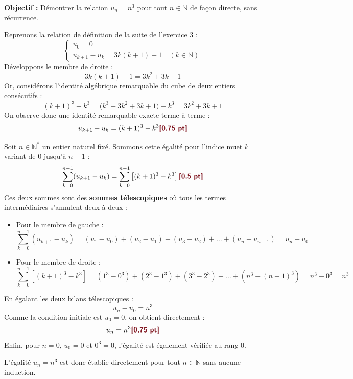 \documentclass[11pt,a4paper]{article}
\newcommand{\bareme}[1]{\hfill\textbf{\textcolor{secondary}{\sffamily[#1]}}}
\newcommand{\N}{\mathbb{N}}
\begin{document}
\begin{correctionbox}[Corrigé du Bonus (+2 points) \bareme{Total : +2 points}]
\textbf{Objectif :} Démontrer la relation $u_n = n^3$ pour tout $n \in \N$ de façon directe, sans récurrence.

\medskip
Reprenons la relation de définition de la suite de l'exercice 3 :
\[
\begin{cases}
u_0 = 0 \\
u_{k+1} - u_k = 3k(k+1) + 1 \quad (k \in \N)
\end{cases}
\]
Développons le membre de droite :
\[
3k(k+1) + 1 = 3k^2 + 3k + 1
\]
Or, considérons l'identité algébrique remarquable du cube de deux entiers consécutifs :
\[
(k+1)^3 - k^3 = \big(k^3 + 3k^2 + 3k + 1\big) - k^3 = 3k^2 + 3k + 1
\]
On observe donc une identité remarquable exacte terme à terme :
\[
u_{k+1} - u_k = (k+1)^3 - k^3 \bareme{0,75 pt}
\]

Soit $n \in \N^*$ un entier naturel fixé. Sommons cette égalité pour l'indice muet $k$ variant de $0$ jusqu'à $n-1$ :
\[
\sum_{k=0}^{n-1} (u_{k+1} - u_k) = \sum_{k=0}^{n-1} \left[ (k+1)^3 - k^3 \right] \bareme{0,5 pt}
\]
Ces deux sommes sont des \textbf{sommes télescopiques} où tous les termes intermédiaires s'annulent deux à deux :
\begin{itemize}[leftmargin=*, label=$\bullet$]
    \item Pour le membre de gauche :
    \[
    \sum_{k=0}^{n-1} (u_{k+1} - u_k) = (u_1 - u_0) + (u_2 - u_1) + (u_3 - u_2) + \dots + (u_n - u_{n-1}) = u_n - u_0
    \]
    \item Pour le membre de droite :
    \[
    \sum_{k=0}^{n-1} \left[ (k+1)^3 - k^3 \right] = (1^3 - 0^3) + (2^3 - 1^3) + (3^3 - 2^3) + \dots + (n^3 - (n-1)^3) = n^3 - 0^3 = n^3
    \]
\end{itemize}
En égalant les deux bilans télescopiques :
\[
u_n - u_0 = n^3
\]
Comme la condition initiale est $u_0 = 0$, on obtient directement :
\[
u_n = n^3 \bareme{0,75 pt}
\]
Enfin, pour $n = 0$, $u_0 = 0$ et $0^3 = 0$, l'égalité est également vérifiée au rang 0.

L'égalité $u_n = n^3$ est donc établie directement pour tout $n \in \N$ sans aucune induction.
\end{correctionbox}

\vspace{0.4cm}
\end{document}
